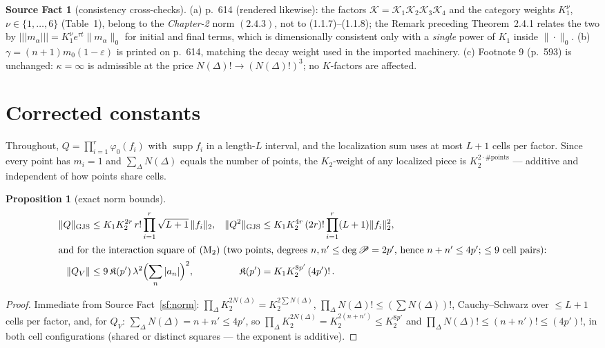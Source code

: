 \documentclass[11pt,a4paper]{article}
\theoremstyle{plain}
\newtheorem{proposition}[theorem]{Proposition}
\theoremstyle{definition}
\newtheorem{srcfact}[theorem]{Source Fact}
\DeclareMathOperator{\supp}{supp}
\begin{document}
\begin{srcfact}[consistency cross-checks]\label{sf:cross}
(a) p.~614 (rendered likewise): the factors $\mathcal K=\mathcal K_1\mathcal K_2\mathcal K_3
\mathcal K_4$ and the category weights $K_1^\nu$, $\nu\in\{1,\dots,6\}$ (Table~1), belong to the
\emph{Chapter-2} norm $(2.4.3)$, not to (1.1.7)--(1.1.8); the Remark preceding Theorem~2.4.1
relates the two by $|\!|\!|m_\alpha|\!|\!|=K_1^\nu e^{\tau t}\|m_\alpha\|_0$ for initial and
final terms, which is dimensionally consistent only with a \emph{single} power of $K_1$ inside
$\|\cdot\|_0$. (b) $\gamma=(n+1)m_0(1-\varepsilon)$ is printed on p.~614, matching the decay
weight used in the imported machinery. (c) Footnote 9 (p.~593) is unchanged: $\kappa=\infty$ is
admissible at the price $N(\Delta)!\to(N(\Delta)!)^3$; no $K$-factors are affected.
\end{srcfact}

\section{Corrected constants}

Throughout, $Q=\prod_{i=1}^r\varphi_0(f_i)$ with $\supp f_i$ in a length-$L$ interval, and the
localization sum uses at most $L+1$ cells per factor. Since every point has $m_i=1$ and
$\sum_\Delta N(\Delta)$ equals the number of points, the $K_2$-weight of any localized piece is
$K_2^{2\cdot\#\text{points}}$ --- additive and independent of how points share cells.

\begin{proposition}[exact norm bounds]\label{prop:norms}
\begin{align*}
  \|Q\|_{\rm GJS}&\le K_1K_2^{2r}\,r!\prod_{i=1}^r\sqrt{L+1}\,\|f_i\|_2, &
  \|Q^2\|_{\rm GJS}&\le K_1K_2^{4r}\,(2r)!\prod_{i=1}^r(L+1)\|f_i\|_2^2 ,\\
  \intertext{and for the interaction square of \textup{(M$_2$)} (two points, degrees
  $n,n'\le\deg\mathscr P=2p'$, hence $n+n'\le4p'$; $\le9$ cell pairs):}
  \|Q_V\|&\le 9\,\mathfrak K(p')\,\lambda^2\Bigl(\sum_n|a_n|\Bigr)^2, &
  \mathfrak K(p')&=K_1K_2^{8p'}\,(4p')! \,.
\end{align*}
\end{proposition}

\begin{proof}
Immediate from Source Fact~\ref{sf:norm}: $\prod_\Delta K_2^{2N(\Delta)}=K_2^{2\sum N(\Delta)}$,
$\prod_\Delta N(\Delta)!\le(\sum N(\Delta))!$, Cauchy--Schwarz over $\le L+1$ cells per factor,
and, for $Q_V$: $\sum_\Delta N(\Delta)=n+n'\le4p'$, so
$\prod_\Delta K_2^{2N(\Delta)}=K_2^{2(n+n')}\le K_2^{8p'}$ and
$\prod_\Delta N(\Delta)!\le(n+n')!\le(4p')!$, in both cell configurations (shared or distinct
squares --- the exponent is additive).
\end{proof}
\end{document}
